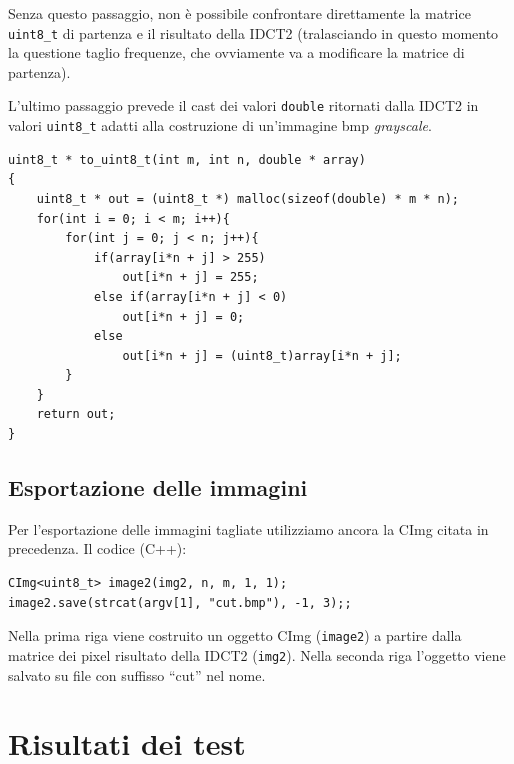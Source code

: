 \documentclass[11pt,a4paper]{scrartcl}
\begin{document}
Senza questo passaggio, non è possibile confrontare direttamente la matrice \texttt{uint8\_t} di partenza e il risultato della IDCT2 (tralasciando in questo momento la questione taglio frequenze, che ovviamente va a modificare la matrice di partenza).

L'ultimo passaggio prevede il cast dei valori \texttt{double} ritornati dalla IDCT2 in valori \texttt{uint8\_t} adatti alla costruzione di un'immagine bmp \emph{grayscale}.

\begin{verbatim}
uint8_t * to_uint8_t(int m, int n, double * array)
{
    uint8_t * out = (uint8_t *) malloc(sizeof(double) * m * n);
    for(int i = 0; i < m; i++){
        for(int j = 0; j < n; j++){
            if(array[i*n + j] > 255)
                out[i*n + j] = 255;
            else if(array[i*n + j] < 0)
                out[i*n + j] = 0;
            else 
                out[i*n + j] = (uint8_t)array[i*n + j];
        }
    }
    return out;
}
\end{verbatim}

\subsection*{Esportazione delle immagini}
Per l'esportazione delle immagini tagliate utilizziamo ancora la CImg citata in precedenza. Il codice (C++):
\begin{verbatim}
CImg<uint8_t> image2(img2, n, m, 1, 1);
image2.save(strcat(argv[1], "cut.bmp"), -1, 3);;
\end{verbatim}

Nella prima riga viene costruito un oggetto CImg (\texttt{image2}) a partire dalla matrice dei pixel risultato della IDCT2 (\texttt{img2}). Nella seconda riga l'oggetto viene salvato su file con suffisso ``cut'' nel nome.

\newpage

\section*{Risultati dei test}

\end{document}
